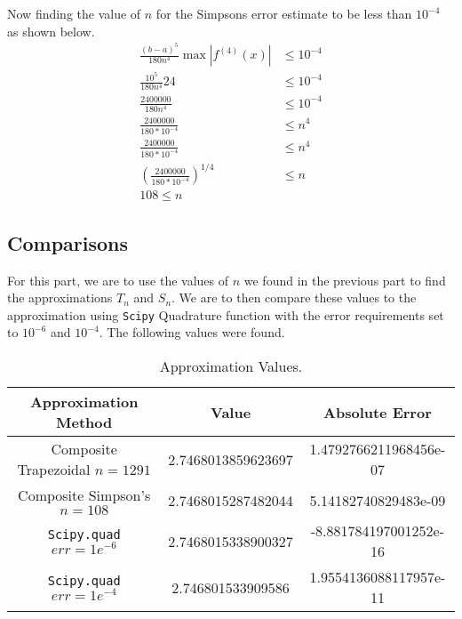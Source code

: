 \documentclass{article}
\begin{document}
Now finding the value of \(n\) for the Simpsons error estimate to be less than \(10^{-4}\) as shown below.
\[
\begin{split}
    \frac{(b-a)^5}{180n^4}\max|f^{(4)}(x)| &\leq 10^{-4} \\
    \frac{10^5}{180n^4}24 &\leq 10^{-4} \\
    \frac{2400000}{180n^4} &\leq 10^{-4} \\
    \frac{2400000}{180*10^{-4}} &\leq n^4 \\
    \frac{2400000}{180*10^{-4}} &\leq n^4 \\
    \left(\frac{2400000}{180*10^{-4}}\right)^{1/4} &\leq n \\
    108 \leq n
\end{split}
\]

\subsection{Comparisons}
For this part, we are to use the values of \(n\) we found in the previous part to find the approximations \(T_n\) and \(S_n\). We are to then compare these values to the approximation using \texttt{Scipy} Quadrature function with the error requirements set to \(10^{-6}\) and \(10^{-4}\). The following values were found.

\begin{table}
    \centering
    \begin{tabular}{|c|c|c|}
    \hline
        Approximation Method & Value & Absolute Error \\
    \hline
        Composite Trapezoidal \(n=1291\) & 2.7468013859623697 & 1.4792766211968456e-07 \\
    \hline
        Composite Simpson's \(n=108\) & 2.7468015287482044 & 5.14182740829483e-09 \\
    \hline
        \texttt{Scipy.quad} \(err = 1e^{-6}\) & 2.7468015338900327 & -8.881784197001252e-16 \\
    \hline
        \texttt{Scipy.quad} \(err = 1e^{-4}\) & 2.746801533909586 & 1.9554136088117957e-11 \\
    \hline
    \end{tabular}
    \caption{Approximation Values.}
    \label{tab:Approximations}
\end{table}

\end{document}
